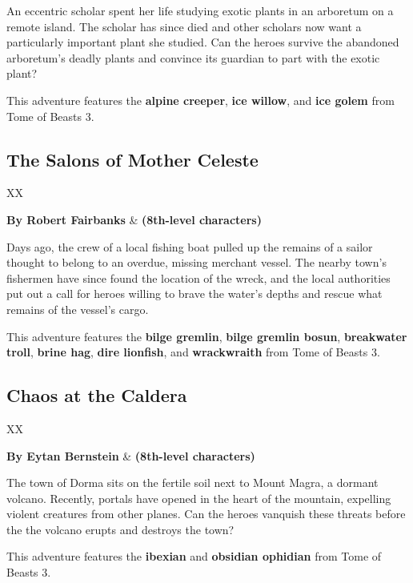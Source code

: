 \documentclass[10pt,a4paper,twoside,bg=print,twocolumn,openany,nodeprecatedcode]{dndbook}
\begin{document}
An eccentric scholar spent her life studying exotic plants in an arboretum on a remote island. The scholar has since died and other scholars now want a particularly important plant she studied. Can the heroes survive the abandoned arboretum's deadly plants and convince its guardian to part with the exotic plant?

This adventure features the \textbf{alpine creeper}, \textbf{ice willow}, and \textbf{ice golem} from Tome of Beasts 3.

\subsection{The Salons of Mother Celeste}

\begin{DndTable}{XX}

\textbf{By Robert Fairbanks} & \textbf{(8th-level characters)}\\
\end{DndTable}

Days ago, the crew of a local fishing boat pulled up the remains of a sailor thought to belong to an overdue, missing merchant vessel. The nearby town's fishermen have since found the location of the wreck, and the local authorities put out a call for heroes willing to brave the water's depths and rescue what remains of the vessel's cargo.

This adventure features the \textbf{bilge gremlin}, \textbf{bilge gremlin bosun}, \textbf{breakwater troll}, \textbf{brine hag}, \textbf{dire lionfish}, and \textbf{wrackwraith} from Tome of Beasts 3.

\subsection{Chaos at the Caldera}

\begin{DndTable}{XX}

\textbf{By Eytan Bernstein} & \textbf{(8th-level characters)}\\
\end{DndTable}

The town of Dorma sits on the fertile soil next to Mount Magra, a dormant volcano. Recently, portals have opened in the heart of the mountain, expelling violent creatures from other planes. Can the heroes vanquish these threats before the the volcano erupts and destroys the town?

This adventure features the \textbf{ibexian} and \textbf{obsidian ophidian} from Tome of Beasts 3.
\end{document}
